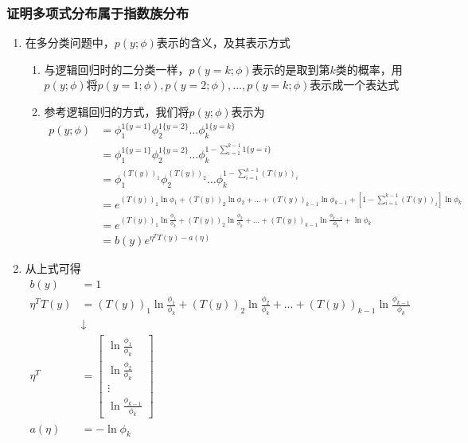 \subsubsection{证明多项式分布属于指数族分布}
\begin{enumerate}
	\item 在多分类问题中，$p(y;\phi)$表示的含义，及其表示方式
	\begin{enumerate}
		\item 与逻辑回归时的二分类一样，$p(y=k;\phi)$表示的是取到第$k$类的概率，用$p(y;\phi)$将$p(y=1;\phi), p(y=2;\phi), \dots, p(y=k;\phi)$表示成一个表达式
		\item 参考逻辑回归的方式，我们将$p(y;\phi)$表示为
		\begin{align}
			p(y;\phi) &= \phi_{1}^{1\{y=1\}}\phi_{2}^{1\{y=2\}}\dots\phi_{k}^{1\{y=k\}} \\
			&= \phi_{1}^{1\{y=1\}}\phi_{2}^{1\{y=2\}}\dots\phi_{k}^{1-\sum_{i=1}^{k-1}1\{y=i\}} \\
			&= \phi_{1}^{\left(T(y)\right)_1}\phi_{2}^{\left(T(y)\right)_2}\dots\phi_{k}^{1-\sum_{i=1}^{k-1}\left(T(y)\right)_i} \\
			&= e^{\left(T(y)\right)_1\ln\phi_1 + \left(T(y)\right)_2\ln\phi_2 + \dots + \left(T(y)\right)_{k-1}\ln\phi_{k-1} + \left[1-\sum_{i=1}^{k-1}\left(T(y)\right)_i\right]\ln\phi_k } \\
			&= e^{\left(T(y)\right)_1\ln\frac{\phi_1}{\phi_k} + \left(T(y)\right)_2\ln\frac{\phi_2}{\phi_k} + \dots + \left(T(y)\right)_{k-1}\ln\frac{\phi_{k-1}}{\phi_k} + \ln\phi_k} \\
			&= b(y)e^{\eta^T T(y) - a(\eta)}
		\end{align}
		\end{enumerate}
	\item 从上式可得
	\begin{align}
		b(y) &= 1 \\
		\eta^TT(y) &= \left(T(y)\right)_1\ln\frac{\phi_1}{\phi_k} + \left(T(y)\right)_2\ln\frac{\phi_2}{\phi_k} + \dots + \left(T(y)\right)_{k-1}\ln\frac{\phi_{k-1}}{\phi_k} \\
		&\downarrow \\
		\eta^T &= \left[\begin{matrix}
		\ln\frac{\phi_1}{\phi_k} \\ \ln\frac{\phi_2}{\phi_k} \\ \vdots \\ \ln\frac{\phi_{k-1}}{\phi_k}
		\end{matrix}\right] \\
		a(\eta) &= -\ln\phi_k
	\end{align}
\end{enumerate}


